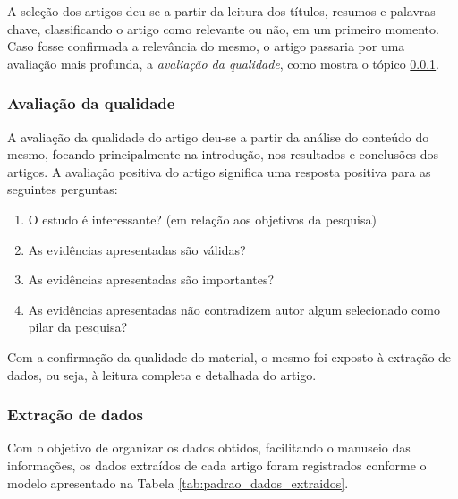 			A seleção dos artigos deu-se a partir da leitura dos títulos, resumos e palavras-chave, classificando o artigo como relevante ou não, em um primeiro momento. Caso fosse confirmada a relevância do mesmo, o artigo passaria por uma avaliação mais profunda, a \textit{avaliação da qualidade}, como mostra o tópico \ref{sub:avaliacao_qualidade}.


		\subsubsection{Avaliação da qualidade}
		\label{sub:avaliacao_qualidade}

			A avaliação da qualidade do artigo deu-se a partir da análise do conteúdo do mesmo, focando principalmente na introdução, nos resultados e conclusões dos artigos. A avaliação positiva do artigo significa uma resposta positiva para as seguintes perguntas:

			\begin{enumerate}
				\item O estudo é interessante? (em relação aos objetivos da pesquisa)
				\item As evidências apresentadas são válidas?
				\item As evidências apresentadas são importantes?
				\item As evidências apresentadas não contradizem autor algum selecionado como pilar da pesquisa?
			\end{enumerate}

			Com a confirmação da qualidade do material, o mesmo foi exposto à extração de dados, ou seja, à leitura completa e detalhada do artigo.

		\subsubsection{Extração de dados}

			Com o objetivo de organizar os dados obtidos, facilitando o manuseio das informações, os dados extraídos de cada artigo foram registrados conforme o modelo apresentado na Tabela \ref{tab:padrao_dados_extraidos}.

